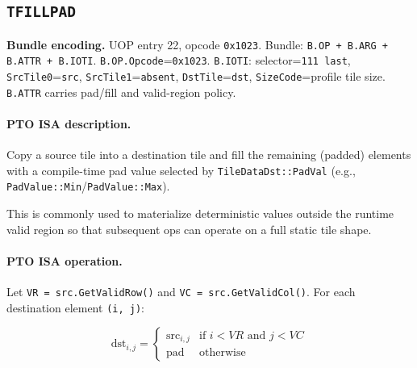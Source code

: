 \subsection{\texttt{TFILLPAD}}
\noindent\textbf{Bundle encoding.} UOP entry 22, opcode \texttt{0x1023}. Bundle: \texttt{B.OP + B.ARG + B.ATTR + B.IOTI}. \texttt{B.OP.Opcode}=\texttt{0x1023}. \texttt{B.IOTI}: selector=\texttt{111 last}, \texttt{SrcTile0}=\texttt{src}, \texttt{SrcTile1}=\texttt{absent}, \texttt{DstTile}=\texttt{dst}, \texttt{SizeCode}=profile tile size. \texttt{B.ATTR} carries pad/fill and valid-region policy.\par\smallskip

\paragraph{PTO ISA description.}
Copy a source tile into a destination tile and fill the remaining (padded) elements with a compile-time pad value selected by \texttt{TileDataDst::PadVal} (e.g., \texttt{PadValue::Min}/\texttt{PadValue::Max}).

This is commonly used to materialize deterministic values outside the runtime valid region so that subsequent ops can operate on a full static tile shape.
\paragraph{PTO ISA operation.}
Let \texttt{VR = src.GetValidRow()} and \texttt{VC = src.GetValidCol()}. For each destination element \texttt{(i, j)}:

\[
\mathrm{dst}_{i,j} =
\begin{cases}
\mathrm{src}_{i,j} & \text{if } i < VR \text{ and } j < VC \\
\mathrm{pad}       & \text{otherwise}
\end{cases}
\]


